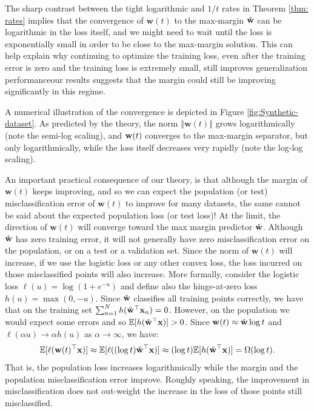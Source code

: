 \documentclass[twoside,11pt,english]{article}
\begin{document}
The sharp contrast between the tight logarithmic and $1/t$ rates in Theorem \ref{thm: rates} implies that the convergence
of $\mathbf{w}(t)$ to the max-margin $\hat{\mathbf{w}}$ can be logarithmic
in the loss itself, and we might need to wait until the loss is exponentially
small in order to be close to the max-margin solution. This can help
explain why continuing to optimize the training loss, even after the
training error is zero and the training loss is extremely small, still
improves generalization performance\textemdash our results suggests
that the margin could still be improving significantly in this regime.

A numerical illustration of the convergence is depicted in Figure
\ref{fig:Synthetic-dataset}. As predicted by the theory, the norm
$\left\Vert \mathbf{w}(t)\right\Vert $ grows logarithmically (note
the semi-log scaling), and $\mathbf{w}(t)$ converges to the max-margin separator,
but only logarithmically, while the loss itself decreases very rapidly
(note the log-log scaling).

An important practical consequence of our theory, is that although
the margin of $\mathbf{w}(t)$ keeps improving, and so we can expect
the population (or test) misclassification error of $\mathbf{w}(t)$
to improve for many datasets, the same cannot be said about the expected
population loss (or test loss)! At the limit, the direction of $\mathbf{w}(t)$
will converge toward the max margin predictor $\hat{\mathbf{w}}$. Although $\hat{\mathbf{w}}$
has zero training error, it will not generally have zero misclassification
error on the population, or on a test or a validation set. Since the
norm of $\mathbf{w}(t)$ will increase, if we use the logistic loss
or any other convex loss, the loss incurred on those misclassified
points will also increase. More formally, consider the logistic loss
$\ell(u)=\log(1+e^{-u})$ and define also the hinge-at-zero loss $h(u)=\max(0,-u)$.
Since $\hat{\mathbf{w}}$ classifies all training points correctly, we have that
on the training set $\sum_{n=1}^{N}h(\hat{\mathbf{w}}^{\top}\mathbf{x}_{n})=0$. However,
on the population we would expect some errors and so $\mathbb{E}[h(\hat{\mathbf{w}}^{\top}\mathbf{x})]>0$.
Since $\mathbf{w}(t)\approx\hat{\mathbf{w}}\log t$ and $\ell(\alpha u)\rightarrow\alpha h(u)$
as $\alpha\rightarrow\infty$, we have: 
\begin{equation}
\mathbb{E}[\ell(\mathbf{w}(t)^{\top}\mathbf{x})]\approx\mathbb{E}[\ell((\log t)\hat{\mathbf{w}}^{\top}\mathbf{x})]\approx(\log t)\mathbb{E}[h(\hat{\mathbf{w}}^{\top}\mathbf{x})]=\Omega(\log t).\label{eq:poploss}
\end{equation}
That is, the population loss increases logarithmically while the margin
and the population misclassification error improve. Roughly speaking,
the improvement in misclassification does not out-weight the increase
in the loss of those points still misclassified.
\end{document}
